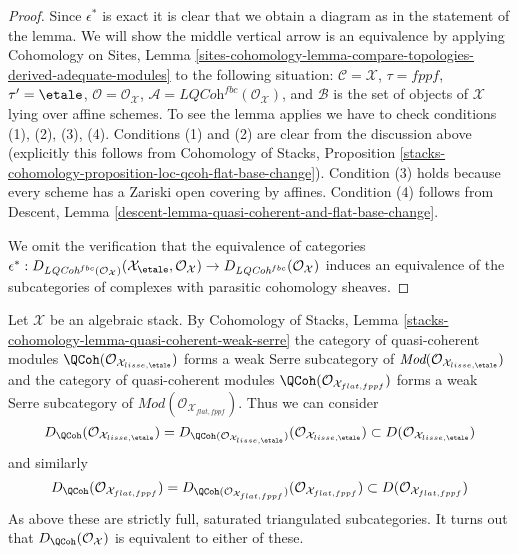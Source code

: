 \begin{proof}
Since $\epsilon^*$ is exact it is clear that we obtain a diagram as
in the statement of the lemma. We will show the middle vertical
arrow is an equivalence by applying
Cohomology on Sites, Lemma
\ref{sites-cohomology-lemma-compare-topologies-derived-adequate-modules}
to the following situation:
$\mathcal{C} = \mathcal{X}$,
$\tau = fppf$,
$\tau' = \etale$,
$\mathcal{O} = \mathcal{O}_\mathcal{X}$,
$\mathcal{A} = \textit{LQCoh}^{fbc}(\mathcal{O}_\mathcal{X})$, and
$\mathcal{B}$ is the set of objects of $\mathcal{X}$ lying over
affine schemes. To see the lemma applies we have to check conditions
(1), (2), (3), (4). Conditions (1) and (2) are clear from the discussion
above (explicitly this follows from
Cohomology of Stacks,
Proposition \ref{stacks-cohomology-proposition-loc-qcoh-flat-base-change}).
Condition (3) holds because every scheme has a Zariski
open covering by affines. Condition (4) follows from
Descent, Lemma \ref{descent-lemma-quasi-coherent-and-flat-base-change}.

\medskip\noindent
We omit the verification that the equivalence of
categories $\epsilon^* : 
D_{\textit{LQCoh}^{fbc}(\mathcal{O}_\mathcal{X})}(
\mathcal{X}_\etale, \mathcal{O}_\mathcal{X})
\to
D_{\textit{LQCoh}^{fbc}}(\mathcal{O}_\mathcal{X})$
induces an equivalence of the subcategories of complexes
with parasitic cohomology sheaves.
\end{proof}

\noindent
Let $\mathcal{X}$ be an algebraic stack.
By Cohomology of Stacks, Lemma
\ref{stacks-cohomology-lemma-quasi-coherent-weak-serre}
the category of quasi-coherent modules
$\QCoh(\mathcal{O}_{\mathcal{X}_{lisse,\etale}})$
forms a weak Serre subcategory of
$\textit{Mod}(\mathcal{O}_{\mathcal{X}_{lisse,\etale}})$
and the category of quasi-coherent modules
$\QCoh(\mathcal{O}_{\mathcal{X}_{flat,fppf}})$
forms a weak Serre subcategory of
$\textit{Mod}(\mathcal{O}_{\mathcal{X}_{flat,fppf}})$.
Thus we can consider
$$
D_\QCoh(\mathcal{O}_{\mathcal{X}_{lisse,\etale}}) =
D_{\QCoh(\mathcal{O}_{\mathcal{X}_{lisse,\etale}})}(
\mathcal{O}_{\mathcal{X}_{lisse,\etale}})
\subset
D(\mathcal{O}_{\mathcal{X}_{lisse,\etale}})
$$
and similarly
$$
D_\QCoh(\mathcal{O}_{\mathcal{X}_{flat,fppf}}) =
D_{\QCoh(\mathcal{O}_{\mathcal{X}_{flat,fppf}})}(
\mathcal{O}_{\mathcal{X}_{flat,fppf}})
\subset
D(\mathcal{O}_{\mathcal{X}_{flat,fppf}})
$$
As above these are strictly full, saturated triangulated subcategories.
It turns out that $D_\QCoh(\mathcal{O}_\mathcal{X})$
is equivalent to either of these.

